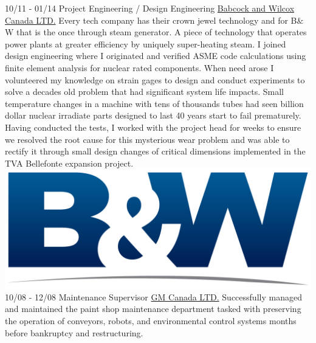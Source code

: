 \documentclass[]{friggeri-cv}
\begin{document}
\begin{entrylist}
  \wentry
    {10/11 - 01/14}
    {Project Engineering / Design Engineering}
    {\href{https://www.bwxt.com/}{Babcock and Wilcox Canada LTD.}}
    {Every tech company has their crown jewel technology and for B$\&$W that is the once through steam generator. A piece of technology that operates power plants at greater efficiency by uniquely super-heating steam. I joined design engineering where I originated and verified ASME code calculations using finite element analysis for nuclear rated components. When need arose I volunteered my knowledge on strain gages to design and conduct experiments to solve a decades old problem that had significant system life impacts. Small  temperature changes in a machine with tens of thousands tubes had seen billion dollar nuclear irradiate parts designed to last 40 years start to fail prematurely. Having conducted the tests, I worked with the project head for weeks to ensure we resolved the root cause for this mysterious wear problem and was able to rectify it through small design changes of critical dimensions implemented in the TVA Bellefonte expansion project.}
    {\includegraphics[scale=0.18]{img/Babcock-Wilcox.jpg}}
    \wentry
    {10/08 - 12/08}
    {Maintenance Supervisor}
    {\href{https://www.gm.ca/en/home.html}{GM Canada LTD.}}
    {Successfully managed and maintained the paint shop maintenance department tasked with preserving the operation of conveyors, robots, and environmental control systems months before bankruptcy and restructuring.}
    {}
\end{entrylist}
\newpage
\end{document}
